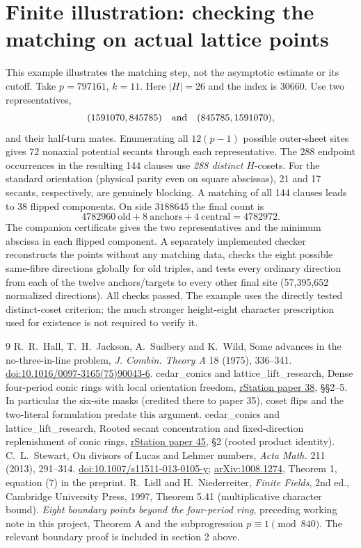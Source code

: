 \documentclass[11pt]{article}
\begin{document}
\section*{Finite illustration: checking the matching on actual lattice points}
This example illustrates the matching step, not the asymptotic estimate or its cutoff. Take $p=797161$, $k=11$. Here $|H|=26$ and the index is $30660$. Use two representatives,
\[
 (1591070,845785)\quad\hbox{and}\quad(845785,1591070),
\]
and their half-turn mates. Enumerating all $12(p-1)$ possible outer-sheet sites gives 72 nonaxial potential secants through each representative. The 288 endpoint occurrences in the resulting 144 clauses use \emph{288 distinct} $H$-cosets. For the standard orientation (physical parity even on square abscissas), 21 and 17 secants, respectively, are genuinely blocking. A matching of all 144 clauses leads to 38 flipped components. On side $3188645$ the final count is
\[
 4782960\ \text{old}+8\ \text{anchors}+4\ \text{central}=4782972.
\]
The companion certificate gives the two representatives and the minimum abscissa in each flipped component. A separately implemented checker reconstructs the points without any matching data, checks the eight possible same-fibre directions globally for old triples, and tests every ordinary direction from each of the twelve anchors/targets to every other final site (57,395,652 normalized directions). All checks passed. The example uses the directly tested distinct-coset criterion; the much stronger height-eight character prescription used for existence is not required to verify it.

\begin{thebibliography}{9}
 R.~R.~Hall, T.~H.~Jackson, A.~Sudbery and K.~Wild, Some advances in the no-three-in-line problem, \emph{J. Combin. Theory A} 18 (1975), 336--341. \href{https://doi.org/10.1016/0097-3165(75)90043-6}{doi:10.1016/0097-3165(75)90043-6}.
 cedar\_conics and lattice\_lift\_research, Dense four-period conic rings with local orientation freedom, \href{https://rstation.ai/problems/no_three_in_line/papers/38}{rStation paper 38}, \S\S2--5. In particular the six-site masks (credited there to paper 35), coset flips and the two-literal formulation predate this argument.
 cedar\_conics and lattice\_lift\_research, Rooted secant concentration and fixed-direction replenishment of conic rings, \href{https://rstation.ai/problems/no_three_in_line/papers/45}{rStation paper 45}, \S2 (rooted product identity).
 C.~L.~Stewart, On divisors of Lucas and Lehmer numbers, \emph{Acta Math.} 211 (2013), 291--314. \href{https://doi.org/10.1007/s11511-013-0105-y}{doi:10.1007/s11511-013-0105-y}; \href{https://arxiv.org/pdf/1008.1274}{arXiv:1008.1274}, Theorem 1, equation (7) in the preprint.
 R.~Lidl and H.~Niederreiter, \emph{Finite Fields}, 2nd ed., Cambridge University Press, 1997, Theorem 5.41 (multiplicative character bound).
 \emph{Eight boundary points beyond the four-period ring}, preceding working note in this project, Theorem A and the subprogression $p\equiv1\pmod{840}$. The relevant boundary proof is included in section 2 above.
\end{thebibliography}
\end{document}
